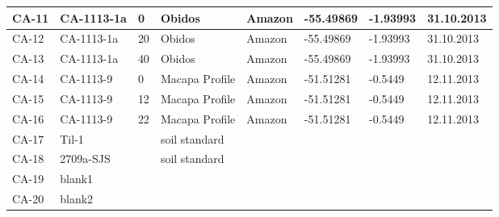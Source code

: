 \begin{table}[h]
\begin{tabular}{|l|l|l|l|l|l|l|l|}
CA-11   & CA-1113-1a           & 0     & Obidos                 & Amazon  & -55.49869    & -1.93993     & 31.10.2013    \\ \hline
CA-12   & CA-1113-1a           & 20    & Obidos                 & Amazon  & -55.49869    & -1.93993     & 31.10.2013    \\ \hline
CA-13   & CA-1113-1a           & 40    & Obidos                 & Amazon  & -55.49869    & -1.93993     & 31.10.2013    \\ \hline
CA-14   & CA-1113-9            & 0     & Macapa Profile         & Amazon  & -51.51281    & -0.5449      & 12.11.2013    \\ \hline
CA-15   & CA-1113-9            & 12    & Macapa Profile         & Amazon  & -51.51281    & -0.5449      & 12.11.2013    \\ \hline
CA-16   & CA-1113-9            & 22    & Macapa Profile         & Amazon  & -51.51281    & -0.5449      & 12.11.2013    \\ \hline
CA-17   & Til-1                &       & soil standard          &         &              &              &               \\ \hline
CA-18   & 2709a-SJS            &       & soil standard          &         &              &              &               \\ \hline
CA-19   & blank1               &       &                        &         &              &              &               \\ \hline
CA-20   & blank2               &       &                        &         &              &              &               \\ \hline
\end{tabular}
\end{table}
